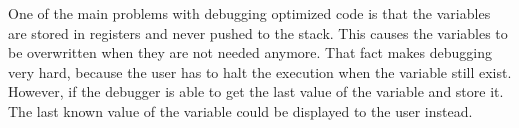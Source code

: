 One of the main problems with debugging optimized code is that the variables are stored in registers and never pushed to the stack.
This causes the variables to be overwritten when they are not needed anymore.
That fact makes debugging very hard, because the user has to halt the execution when the variable still exist.
However, if the debugger is able to get the last value of the variable and store it.
The last known value of the variable could be displayed to the user instead.




